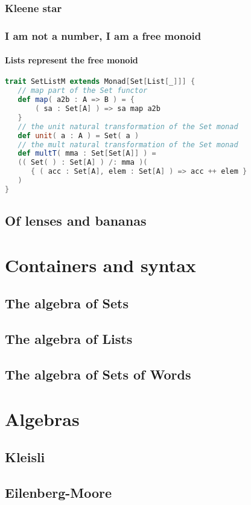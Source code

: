 \subsubsection{Kleene star}

\subsubsection{I am not a number, I am a free monoid}

\paragraph{Lists represent the free monoid}

\begin{lstlisting}[language=Scala,mathescape=true]
trait SetListM extends Monad[Set[List[_]]] {
   // map part of the Set functor
   def map( a2b : A => B ) = {
       ( sa : Set[A] ) => sa map a2b
   }
   // the unit natural transformation of the Set monad
   def unit( a : A ) = Set( a )
   // the mult natural transformation of the Set monad
   def multT( mma : Set[Set[A]] ) =
   (( Set( ) : Set[A] ) /: mma )(
      { ( acc : Set[A], elem : Set[A] ) => acc ++ elem }
   )
}
\end{lstlisting}

\subsection{Of lenses and bananas}

\section{Containers and syntax}

\subsection{The algebra of Sets}

\subsection{The algebra of Lists}

\subsection{The algebra of Sets of Words}

\section{Algebras}

\subsection{Kleisli}

\subsection{Eilenberg-Moore}
